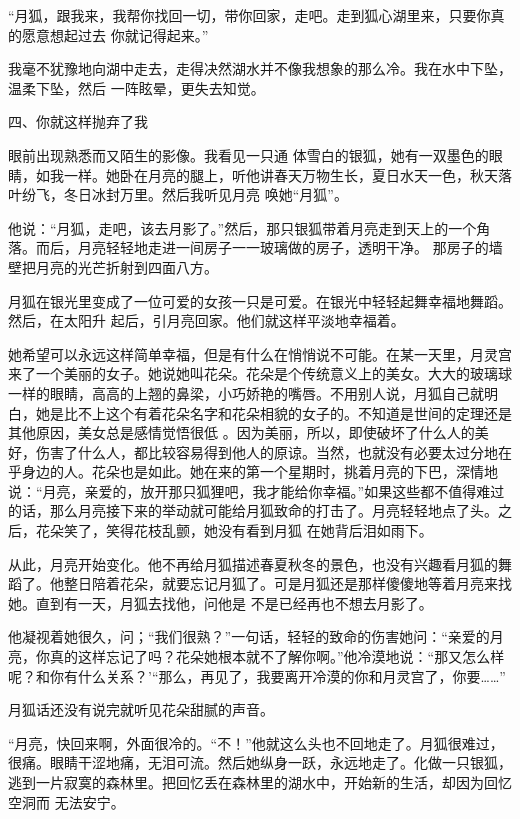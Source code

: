 \documentclass{article}
\begin{document}
“月狐，跟我来，我帮你找回一切，带你回家，走吧。走到狐心湖里来，只要你真的愿意想起过去
你就记得起来。” 

我毫不犹豫地向湖中走去，走得决然湖水并不像我想象的那么冷。我在水中下坠，温柔下坠，然后
一阵眩晕，更失去知觉。 


四、你就这样抛弃了我 

眼前出现熟悉而又陌生的影像。我看见一只通
\newpage
体雪白的银狐，她有一双墨色的眼睛，如我一样。她卧在月亮的腿上，听他讲春天万物生长，夏日水天一色，秋天落叶纷飞，冬日冰封万里。然后我听见月亮
唤她“月狐”。 

他说：“月狐，走吧，该去月影了。”然后，那只银狐带着月亮走到天上的一个角落。而后，月亮轻轻地走进一间房子一一玻璃做的房子，透明干净。
那房子的墙壁把月亮的光芒折射到四面八方。 

月狐在银光里变成了一位可爱的女孩一只是可爱。在银光中轻轻起舞幸福地舞蹈。然后，在太阳升
起后，引月亮回家。他们就这样平淡地幸福着。 

她希望可以永远这样简单幸福，但是有什么在悄悄说不可能。在某一天里，月灵宫来了一个美丽的女子。她说她叫花朵。花朵是个传统意义上的美女。大大的玻璃球一样的眼睛，高高的上翘的鼻梁，小巧娇艳的嘴唇。不用别人说，月狐自己就明白，她是比不上这个有着花朵名字和花朵相貌的女子的。不知道是世间的定理还是其他原因，美女总是感情觉悟很低
\newpage
。因为美丽，所以，即使破坏了什么人的美好，伤害了什么人，都比较容易得到他人的原谅。当然，也就没有必要太过分地在乎身边的人。花朵也是如此。她在来的第一个星期时，挑着月亮的下巴，深情地说：“月亮，亲爱的，放开那只狐狸吧，我才能给你幸福。”如果这些都不值得难过的话，那么月亮接下来的举动就可能给月狐致命的打击了。月亮轻轻地点了头。之后，花朵笑了，笑得花枝乱颤，她没有看到月狐
在她背后泪如雨下。 

从此，月亮开始变化。他不再给月狐描述春夏秋冬的景色，也没有兴趣看月狐的舞蹈了。他整日陪着花朵，就要忘记月狐了。可是月狐还是那样傻傻地等着月亮来找她。直到有一天，月狐去找他，问他是
不是已经再也不想去月影了。 

他凝视着她很久，问；“我们很熟？”一句话，轻轻的致命的伤害她问：“亲爱的月亮，你真的这样忘记了吗？花朵她根本就不了解你啊。”他冷漠地说：“那又怎么样呢？和你有什么关系？’“那么，再见了，我要离开冷漠的你和月灵宫了，你要……”
\newpage

月狐话还没有说完就听见花朵甜腻的声音。 

“月亮，快回来啊，外面很冷的。“不！”他就这么头也不回地走了。月狐很难过，很痛。眼睛干涩地痛，无泪可流。然后她纵身一跃，永远地走了。化做一只银狐，逃到一片寂寞的森林里。把回忆丢在森林里的湖水中，开始新的生活，却因为回忆空洞而
无法安宁。 
\end{document}

